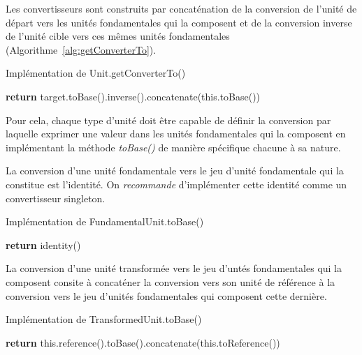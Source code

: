 \documentclass[a4paper,draft,twoside,10pt]{article}
\begin{document}
Les convertisseurs sont construits par concaténation de la conversion de l'unité de départ vers les unités fondamentales
qui la composent et de la conversion inverse de l'unité cible vers ces mêmes unités fondamentales
(Algorithme~\ref{alg:getConverterTo​}).

\begin{algorithm}[!h]
\caption{Implémentation de Unit.getConverterTo​()}\label{alg:getConverterTo​}
\begin{algorithmic}
\State \textbf{return} target.toBase().inverse().concatenate(this.toBase())
\EndProcedure
\end{algorithmic}
\end{algorithm}

Pour cela, chaque type d'unité doit être capable de définir la conversion par laquelle exprimer une valeur dans les
unités fondamentales qui la composent en implémentant la méthode \emph{toBase()} de manière spécifique chacune à sa
nature.

La conversion d'une unité fondamentale vers le jeu d'unité fondamentale qui la constitue est l'identité. On
\emph{recommande} d'implémenter cette identité comme un convertisseur singleton.

\begin{algorithm}[!h]
\caption{Implémentation de FundamentalUnit.toBase()}\label{alg:fundamentalUnit:toBase}
\begin{algorithmic}
\State \textbf{return} identity()
\EndProcedure
\end{algorithmic}
\end{algorithm}

La conversion d'une unité transformée vers le jeu d'untés fondamentales qui la composent consite à concaténer la
conversion vers son unité de référence à la conversion vers le jeu d'unités fondamentales qui composent cette dernière.

\begin{algorithm}[!h]
\caption{Implémentation de TransformedUnit.toBase()}\label{alg:transformedUnit:toBase}
\begin{algorithmic}
\State \textbf{return} this.reference().toBase().concatenate(this.toReference())
\EndProcedure
\end{algorithmic}
\end{algorithm}
\end{document}
